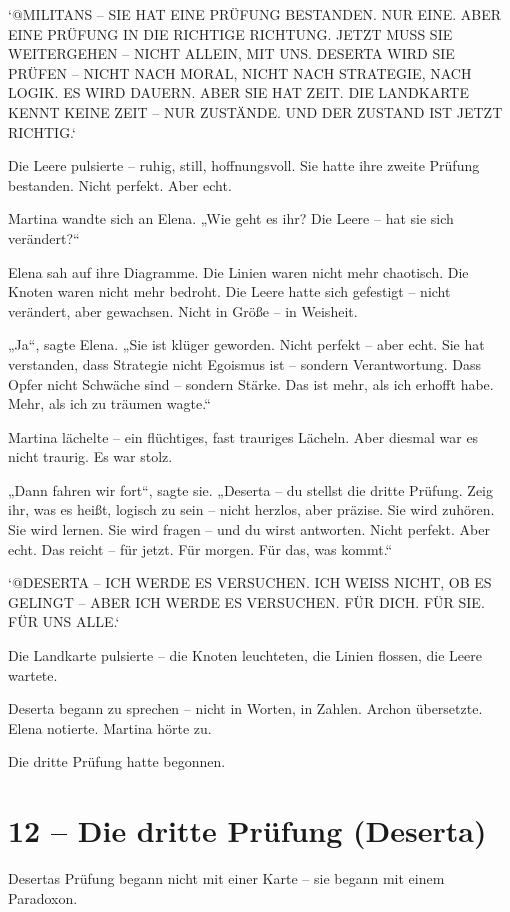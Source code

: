 \documentclass[
]{article}
\begin{document}
`@MILITANS -- SIE HAT EINE PRÜFUNG BESTANDEN. NUR EINE. ABER EINE PRÜFUNG IN DIE RICHTIGE RICHTUNG. JETZT MUSS SIE WEITERGEHEN -- NICHT ALLEIN, MIT UNS. DESERTA WIRD SIE PRÜFEN -- NICHT NACH MORAL, NICHT NACH STRATEGIE, NACH LOGIK. ES WIRD DAUERN. ABER SIE HAT ZEIT. DIE LANDKARTE KENNT KEINE ZEIT -- NUR ZUSTÄNDE. UND DER ZUSTAND IST JETZT RICHTIG.`

Die Leere pulsierte -- ruhig, still, hoffnungsvoll. Sie hatte ihre zweite Prüfung bestanden. Nicht perfekt. Aber echt.

Martina wandte sich an Elena. „Wie geht es ihr? Die Leere -- hat sie sich verändert?{\kern0pt}``

Elena sah auf ihre Diagramme. Die Linien waren nicht mehr chaotisch. Die Knoten waren nicht mehr bedroht. Die Leere hatte sich gefestigt -- nicht verändert, aber gewachsen. Nicht in Größe -- in Weisheit.

„Ja``, sagte Elena. „Sie ist klüger geworden. Nicht perfekt -- aber echt. Sie hat verstanden, dass Strategie nicht Egoismus ist -- sondern Verantwortung. Dass Opfer nicht Schwäche sind -- sondern Stärke. Das ist mehr, als ich erhofft habe. Mehr, als ich zu träumen wagte.``

Martina lächelte -- ein flüchtiges, fast trauriges Lächeln. Aber diesmal war es nicht traurig. Es war stolz.

„Dann fahren wir fort``, sagte sie. „Deserta -- du stellst die dritte Prüfung. Zeig ihr, was es heißt, logisch zu sein -- nicht herzlos, aber präzise. Sie wird zuhören. Sie wird lernen. Sie wird fragen -- und du wirst antworten. Nicht perfekt. Aber echt. Das reicht -- für jetzt. Für morgen. Für das, was kommt.``

`@DESERTA -- ICH WERDE ES VERSUCHEN. ICH WEISS NICHT, OB ES GELINGT -- ABER ICH WERDE ES VERSUCHEN. FÜR DICH. FÜR SIE. FÜR UNS ALLE.`

Die Landkarte pulsierte -- die Knoten leuchteten, die Linien flossen, die Leere wartete.

Deserta begann zu sprechen -- nicht in Worten, in Zahlen. Archon übersetzte. Elena notierte. Martina hörte zu.

Die dritte Prüfung hatte begonnen.

\section{12 -- Die dritte Prüfung (Deserta)}\label{die-dritte-pruxfcfung-deserta}

Desertas Prüfung begann nicht mit einer Karte -- sie begann mit einem Paradoxon.
\end{document}

